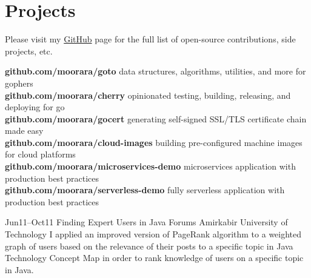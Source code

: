 \documentclass[]{cv-style}                     %
\begin{document}

\section{Projects}

Please visit my \href{http://github.com/moorara}{GitHub} page for the full list of open-source contributions, side projects, etc.

\textbf{github.com/moorara/goto} data structures, algorithms, utilities, and more for gophers \\
\textbf{github.com/moorara/cherry} opinionated testing, building, releasing, and deploying for go  \\
\textbf{github.com/moorara/gocert} generating self-signed SSL/TLS certificate chain made easy \\
\textbf{github.com/moorara/cloud-images} building pre-configured machine images for cloud platforms \\
\textbf{github.com/moorara/microservices-demo} microservices application with production best practices  \\
\textbf{github.com/moorara/serverless-demo} fully serverless application with production best practices  \\

\begin{entrylist}

  \entry
  {\small Jun11--Oct11}
  {Finding Expert Users in Java Forums}
  {Amirkabir University of Technology}
  {I applied an improved version of PageRank algorithm to a weighted graph of users based on the relevance of
  their posts to a specific topic in Java Technology Concept Map in order to rank knowledge of users on a specific topic in Java.}


\end{entrylist}


\end{document}
